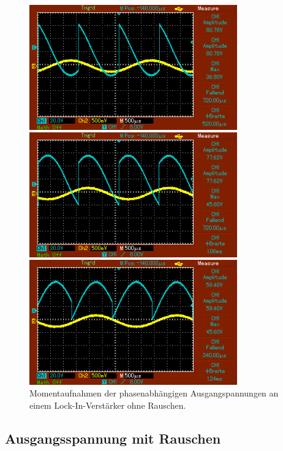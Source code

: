 \begin{figure}
\begin{minipage}{0.5\textwidth}
        \caption{$\phi = \SI{180}{\degree}$.} 
        \label{fig:15}
    \end{minipage}
    \hfill
    \begin{minipage}{0.5\textwidth}
        \centering
        \includegraphics[width=0.8\textwidth]{bilder/240ohne.png}
        \caption{$\phi = \SI{240}{\degree}$.} 
        \label{fig:16}
    \end{minipage}
    \vspace{1cm}
    \vfill
    \begin{minipage}{0.5\textwidth}
        \centering
        \includegraphics[width=0.8\textwidth]{bilder/300ohne.png}
        \caption{$\phi = \SI{300}{\degree}$.} 
        \label{fig:17}
    \end{minipage}
    \hfill
    \begin{minipage}{0.5\textwidth}
        \centering
        \includegraphics[width=0.8\textwidth]{bilder/360ohne.png}
        \caption{$\phi = \SI{360}{\degree}$.} 
        \label{fig:18}
    \end{minipage}
    \caption{Momentaufnahmen der phasenabhängigen Ausgangspannungen an einem Lock-In-Verstärker ohne Rauschen.}
\end{figure}

\subsection{Ausgangsspannung mit Rauschen}
